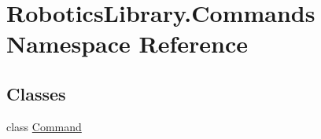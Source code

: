 \hypertarget{namespace_robotics_library_1_1_commands}{}\section{Robotics\+Library.\+Commands Namespace Reference}
\label{namespace_robotics_library_1_1_commands}
\subsection*{Classes}
\begin{DoxyCompactItemize}
\item 
class \hyperlink{class_robotics_library_1_1_commands_1_1_command}{Command}
\end{DoxyCompactItemize}
